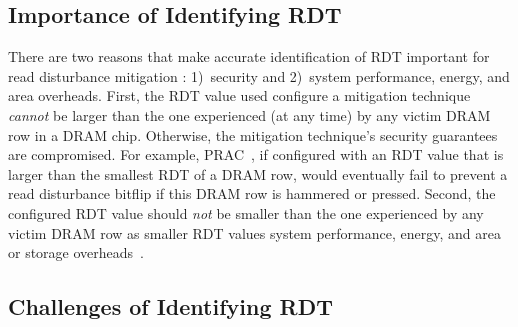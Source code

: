 \subsection{Importance of  Identifying RDT}

There are two reasons that make accurate identification of RDT important for
read disturbance mitigation : 1)~security and 2)~system
performance, energy, and area overheads. First, the RDT value used 
configure a mitigation technique \emph{cannot} be larger than the one
experienced (at any time) by any victim DRAM row in a DRAM chip. Otherwise, the
mitigation technique's security guarantees are compromised. For example,
PRAC~\cite{jedecddr5c,bennett2021panopticon,
canpolat2024understanding,kim2023ddr5,canpolat2025chronus}, if configured with
an RDT value that is larger than the smallest RDT of a DRAM row, would
eventually fail to prevent a read disturbance bitflip if this DRAM row is
hammered or pressed. Second, the configured RDT value should \emph{not} be
 smaller than the one experienced by any victim
DRAM row\gra{,} as smaller RDT values  system
performance, energy, and area or storage
overheads~\cite{olgun2024abacus,canpolat2024understanding,
yaglikci2021blockhammer,kim2020revisiting,qureshi2022hydra,
canpolat2025chronus,yaglikci2024spatial}.

\subsection{Challenges of  Identifying RDT}

